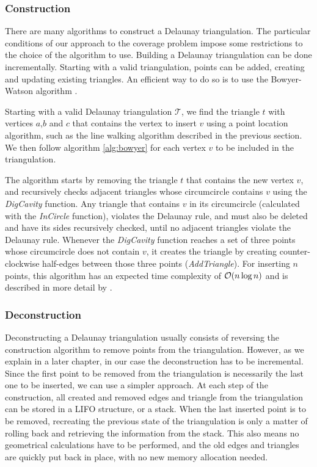 \subsubsection*{Construction}
\label{sect:dtconst}

There are many algorithms to construct a Delaunay triangulation. 
The particular conditions of our approach to the coverage problem impose some restrictions to the choice of the algorithm to use.
Building a Delaunay triangulation can be done incrementally. Starting with a valid triangulation, points can be added, creating and updating existing triangles. An efficient way to do so is to use the Bowyer-Watson algorithm \cite{bwalgo}.

Starting with a valid Delaunay triangulation $\mathcal{T}$, we find the triangle $t$ with vertices $a$,$b$ and $c$ that contains the vertex to insert $v$ using a point location algorithm, such as the line walking algorithm described in the previous section. We then follow algorithm \ref{alg:bowyer} for each vertex $v$ to be included in the triangulation.



The algorithm starts by removing the triangle $t$ that contains the new vertex $v$, and recursively checks adjacent triangles whose circumcircle contains $v$ using the \emph{DigCavity} function. Any triangle that contains $v$ in its circumcircle (calculated with the \emph{InCircle} function), violates the Delaunay rule, and must also be deleted and have its sides recursively checked, until no adjacent triangles violate the Delaunay rule. Whenever the \emph{DigCavity} function reaches a set of three points whose circumcircle does not contain $v$, it creates the triangle by creating counter-clockwise half-edges between those three points (\emph{AddTriangle}). For inserting $n$ points, this algorithm has an expected time complexity of $\mathcal{O}(n \log n)$ and is described in more detail by \citet{tricomplex}.

\subsubsection*{Deconstruction}
Deconstructing a Delaunay triangulation usually consists of reversing the construction algorithm to remove points from the triangulation. However, as we explain in a later chapter, in our case the deconstruction has to be incremental. Since the first point to be removed from the triangulation is necessarily the last one to be inserted, we can use a simpler approach. 
At each step of the construction, all created and removed edges and triangle from the triangulation can be stored in a LIFO structure, or a stack. When the last inserted point is to be removed, recreating the previous state of the triangulation is only a matter of rolling back and retrieving the information from the stack. This also means no geometrical calculations have to be performed, and the old edges and triangles are quickly put back in place, with no new memory allocation needed.

